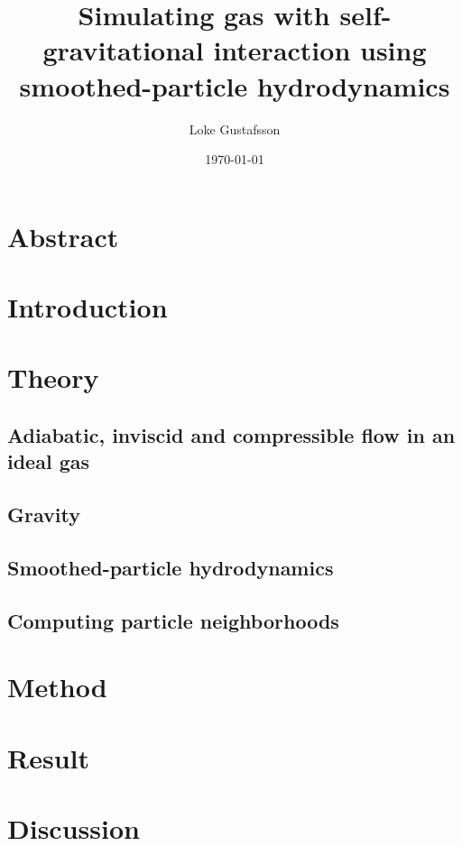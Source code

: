 \documentclass{report}
\title{Simulating gas with self-gravitational interaction using smoothed-particle hydrodynamics}
\subtitle{}
\author{Loke Gustafsson}
\date{\today}
\begin{document}
\begin{spacing}{1.5}



\chapter*{Abstract}
    

\tableofcontents

\chapter{Introduction}
    

\chapter{Theory}
    \section{Adiabatic, inviscid and compressible flow in an ideal gas}
    

    \section{Gravity}
    

    \section{Smoothed-particle hydrodynamics}
    

    \section{Computing particle neighborhoods}
    

\chapter{Method}
    

\chapter{Result}
    

\chapter{Discussion}
    

\printbibliography[heading=bibintoc,title={References}]

\end{spacing}
\end{document}
